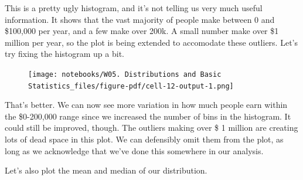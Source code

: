 \documentclass[
  letterpaper,
  DIV=11,
  numbers=noendperiod]{scrreprt}
\newenvironment{Shaded}{\begin{snugshade}}{\end{snugshade}}
\newcommand{\CommentTok}[1]{\textcolor[rgb]{0.37,0.37,0.37}{#1}}
\newcommand{\DecValTok}[1]{\textcolor[rgb]{0.68,0.00,0.00}{#1}}
\newcommand{\NormalTok}[1]{\textcolor[rgb]{0.00,0.23,0.31}{#1}}
\newcommand{\OperatorTok}[1]{\textcolor[rgb]{0.37,0.37,0.37}{#1}}
\newcommand{\StringTok}[1]{\textcolor[rgb]{0.13,0.47,0.30}{#1}}
\newcommand{\VariableTok}[1]{\textcolor[rgb]{0.07,0.07,0.07}{#1}}
\begin{document}
This is a pretty ugly histogram, and it's not telling us very much
useful information. It shows that the vast majority of people make
between 0 and \$100,000 per year, and a few make over 200k. A small
number make over \$1 million per year, so the plot is being extended to
accomodate these outliers. Let's try fixing the histogram up a bit.

\begin{Shaded}
\end{Shaded}

\begin{figure}[H]

{\centering \texttt{[image: notebooks/W05. Distributions and Basic Statistics\_files/figure-pdf/cell-12-output-1.png]}

}

\end{figure}

That's better. We can now see more variation in how much people earn
within the \$0-200,000 range since we increased the number of bins in
the histogram. It could still be improved, though. The outliers making
over \$ 1 million are creating lots of dead space in this plot. We can
defensibly omit them from the plot, as long as we acknowledge that we've
done this somewhere in our analysis.

Let's also plot the mean and median of our distribution.
\end{document}
